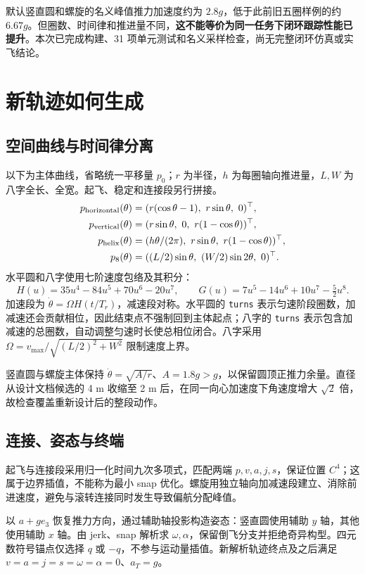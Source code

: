 \documentclass[UTF8,fontset=fandol,a4paper,10pt]{ctexart}
\newcommand{\code}[1]{{\small\nolinkurl{#1}}}
\begin{document}
默认竖直圆和螺旋的名义峰值推力加速度约为 $2.8g$，低于此前旧五圈样例的约 $6.67g$。但圈数、时间律和推进量不同，\textbf{这不能等价为同一任务下闭环跟踪性能已提升}。本次已完成构建、31 项单元测试和名义采样检查，尚无完整闭环仿真或实飞结论。

\clearpage
\section{新轨迹如何生成}
\subsection{空间曲线与时间律分离}
以下为主体曲线，省略统一平移量 $p_0$；$r$ 为半径，$h$ 为每圈轴向推进量，$L,W$ 为八字全长、全宽。起飞、稳定和连接段另行拼接。
\begin{align*}
p_{\rm horizontal}(\theta)&=(r(\cos\theta-1),\ r\sin\theta,\ 0)^\top,\\
p_{\rm vertical}(\theta)&=(r\sin\theta,\ 0,\ r(1-\cos\theta))^\top,\\
p_{\rm helix}(\theta)&=(h\theta/(2\pi),\ r\sin\theta,\ r(1-\cos\theta))^\top,\\
p_{8}(\theta)&=((L/2)\sin\theta,\ (W/2)\sin2\theta,\ 0)^\top.
\end{align*}
水平圆和八字使用七阶速度包络及其积分：
\[
 H(u)=35u^4-84u^5+70u^6-20u^7,\qquad
 G(u)=7u^5-14u^6+10u^7-\tfrac52u^8.
\]
加速段为 $\dot\theta=\Omega H(t/T_r)$，减速段对称。水平圆的 \code{turns} 表示匀速阶段圈数，加减速还会贡献相位，因此结束点不强制回到主体起点；八字的 \code{turns} 表示包含加减速的总圈数，自动调整匀速时长使总相位闭合。八字采用 $\Omega=v_{\max}/\sqrt{(L/2)^2+W^2}$ 限制速度上界。

竖直圆与螺旋主体保持 $\dot\theta=\sqrt{A/r}$、$A=1.8g>g$，以保留圆顶正推力余量。直径从设计文档候选的 4 m 收缩至 2 m 后，在同一向心加速度下角速度增大 $\sqrt{2}$ 倍，故检查覆盖重新设计后的整段动作。

\subsection{连接、姿态与终端}
起飞与连接段采用归一化时间九次多项式，匹配两端 $p,v,a,j,s$，保证位置 $C^4$；这属于边界插值，不能称为最小 snap 优化。螺旋用独立轴向加减速段建立、消除前进速度，避免与滚转连接同时发生导致偏航分配峰值。

以 $a+g e_3$ 恢复推力方向，通过辅助轴投影构造姿态：竖直圆使用辅助 $y$ 轴，其他使用辅助 $x$ 轴。由 jerk、snap 解析求 $\omega,\alpha$，保留倒飞分支并拒绝奇异构型。四元数符号锚点仅选择 $q$ 或 $-q$，不参与运动量插值。新解析轨迹终点及之后满足 $v=a=j=s=\omega=\alpha=0$、$a_T=g$。
\end{document}
